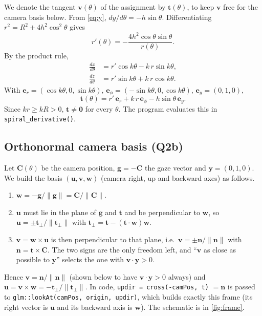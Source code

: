 \documentclass[acmlarge]{acmart}
\begin{document}
We denote the tangent $\mathbf{v}(\theta)$ of the assignment by $\mathbf{t}(\theta)$,
to keep $\mathbf{v}$ free for the camera basis below. From \cref{eq:y},
$dy/d\theta=-h\sin\theta$. Differentiating $r^2=R^2+4h^2\cos^2\theta$ gives
\begin{equation}
  r'(\theta)=-\frac{4h^2\cos\theta\sin\theta}{r(\theta)}.
\end{equation}
By the product rule,
\begin{align}
  \frac{dx}{d\theta}&=r'\cos k\theta-k\,r\sin k\theta,\\
  \frac{dz}{d\theta}&=r'\sin k\theta+k\,r\cos k\theta.
\end{align}
With $\mathbf{e}_r=(\cos k\theta,0,\sin k\theta)$,
$\mathbf{e}_\phi=(-\sin k\theta,0,\cos k\theta)$, $\mathbf{e}_y=(0,1,0)$,
\begin{equation}
  \mathbf{t}(\theta)=r'\,\mathbf{e}_r+k\,r\,\mathbf{e}_\phi-h\sin\theta\,\mathbf{e}_y .
  \label{eq:t}
\end{equation}
Since $kr\ge kR>0$, $\mathbf{t}\neq\mathbf{0}$ for every $\theta$. The program
evaluates this in \texttt{spiral\_derivative()}.

\subsection{Orthonormal camera basis (Q2b)}

Let $\mathbf{C}(\theta)$ be the camera position, $\mathbf{g}=-\mathbf{C}$ the gaze
vector and $\mathbf{y}=(0,1,0)$. We build the basis $(\mathbf{u},\mathbf{v},\mathbf{w})$
(camera right, up and backward axes) as follows.
\begin{enumerate}
  \item $\mathbf{w}=-\mathbf{g}/\|\mathbf{g}\|=\mathbf{C}/\|\mathbf{C}\|$.
  \item $\mathbf{u}$ must lie in the plane of $\mathbf{g}$ and $\mathbf{t}$ and be
  perpendicular to $\mathbf{w}$, so $\mathbf{u}=\pm\mathbf{t}_\perp/\|\mathbf{t}_\perp\|$
  with $\mathbf{t}_\perp=\mathbf{t}-(\mathbf{t}\cdot\mathbf{w})\mathbf{w}$.
  \item $\mathbf{v}=\mathbf{w}\times\mathbf{u}$ is then perpendicular to that plane,
  i.e.\ $\mathbf{v}=\pm\mathbf{n}/\|\mathbf{n}\|$ with
  $\mathbf{n}=\mathbf{t}\times\mathbf{C}$. The two signs are the only freedom left,
  and ``$\mathbf{v}$ as close as possible to $\mathbf{y}$'' selects the one with
  $\mathbf{v}\cdot\mathbf{y}>0$.
\end{enumerate}
Hence $\mathbf{v}=\mathbf{n}/\|\mathbf{n}\|$ (shown below to have $\mathbf{v}\cdot\mathbf{y}>0$
always) and $\mathbf{u}=\mathbf{v}\times\mathbf{w}=-\mathbf{t}_\perp/\|\mathbf{t}_\perp\|$.
In code, \texttt{updir = cross(-camPos, t)} $=\mathbf{n}$ is passed to
\texttt{glm::lookAt(camPos, origin, updir)}, which builds exactly this frame (its
right vector is $\mathbf{u}$ and its backward axis is $\mathbf{w}$). The schematic
is in \cref{fig:frame}.
\end{document}
